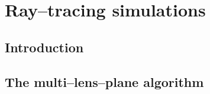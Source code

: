 
\chapter{Ray--tracing simulations}
\lhead[\fancyplain{}{\thepage}]{\fancyplain{}{\rightmark}}
 \thispagestyle{plain}
\setlength{\parindent}{10mm}


\section{Introduction}
\section{The multi--lens--plane algorithm}

%